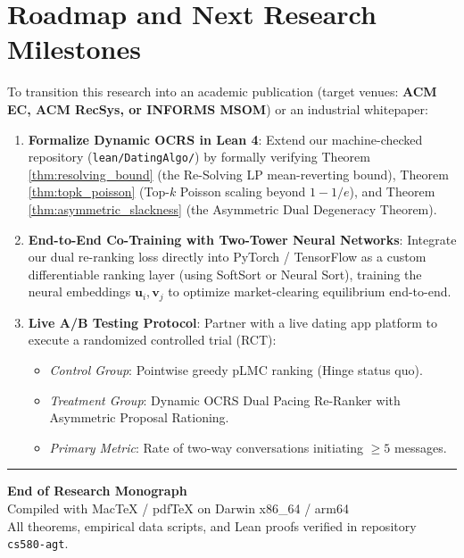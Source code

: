 \documentclass[11pt,letterpaper]{article}
\theoremstyle{definition}
\theoremstyle{plain}
\theoremstyle{remark}
\begin{document}
\newpage
\section{Roadmap and Next Research Milestones}
\label{sec:roadmap}

To transition this research into an academic publication (target venues: \textbf{ACM EC, ACM RecSys, or INFORMS MSOM}) or an industrial whitepaper:

\begin{enumerate}[leftmargin=2em]
    \item \textbf{Formalize Dynamic OCRS in Lean 4}:
    Extend our machine-checked repository (\texttt{lean/DatingAlgo/}) by formally verifying Theorem \ref{thm:resolving_bound} (the Re-Solving LP mean-reverting bound), Theorem \ref{thm:topk_poisson} (Top-$k$ Poisson scaling beyond $1 - 1/e$), and Theorem \ref{thm:asymmetric_slackness} (the Asymmetric Dual Degeneracy Theorem).
    \item \textbf{End-to-End Co-Training with Two-Tower Neural Networks}:
    Integrate our dual re-ranking loss directly into PyTorch / TensorFlow as a custom differentiable ranking layer (using SoftSort or Neural Sort), training the neural embeddings $\mathbf{u}_i, \mathbf{v}_j$ to optimize market-clearing equilibrium end-to-end.
    \item \textbf{Live A/B Testing Protocol}:
    Partner with a live dating app platform to execute a randomized controlled trial (RCT):
    \begin{itemize}
        \item \emph{Control Group}: Pointwise greedy $\mathrm{pLMC}$ ranking (Hinge status quo).
        \item \emph{Treatment Group}: Dynamic OCRS Dual Pacing Re-Ranker with Asymmetric Proposal Rationing.
        \item \emph{Primary Metric}: Rate of two-way conversations initiating $\ge 5$ messages.
    \end{itemize}
\end{enumerate}

\vspace{2em}
\noindent \rule{\textwidth}{0.4pt}
\begin{center}
\small \textbf{End of Research Monograph} \\
Compiled with MacTeX / pdfTeX on Darwin x86\_64 / arm64 \\
All theorems, empirical data scripts, and Lean proofs verified in repository \texttt{cs580-agt}.
\end{center}
\end{document}
